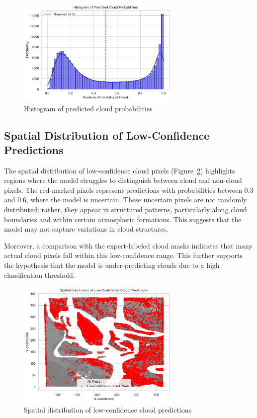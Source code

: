 \documentclass[11pt,letterpaper]{article}
\begin{document}
\begin{figure}[h]
    \centering
    \includegraphics[width=0.7\textwidth]{figs/peda1.pdf}
    \caption{Histogram of predicted cloud probabilities}
    \label{fig:prob_hist}
\end{figure}

\vspace{1em} %
\subsection{Spatial Distribution of Low-Confidence Predictions}
\vspace{0.5em} %

The spatial distribution of low-confidence cloud pixels (Figure~\ref{fig:low_conf_spatial}) highlights regions where the model struggles to distinguish between cloud and non-cloud pixels. The red-marked pixels represent predictions with probabilities between 0.3 and 0.6, where the model is uncertain. These uncertain pixels are not randomly distributed; rather, they appear in structured patterns, particularly along cloud boundaries and within certain atmospheric formations. This suggests that the model may not capture variations in cloud structures.

Moreover, a comparison with the expert-labeled cloud masks indicates that many actual cloud pixels fall within this low-confidence range. This further supports the hypothesis that the model is under-predicting clouds due to a high classification threshold.

\begin{figure}[h]
    \centering
    \includegraphics[width=0.7\textwidth]{figs/peda2.pdf}
    \caption{Spatial distribution of low-confidence cloud predictions}
    \label{fig:low_conf_spatial}
\end{figure}
\end{document}
